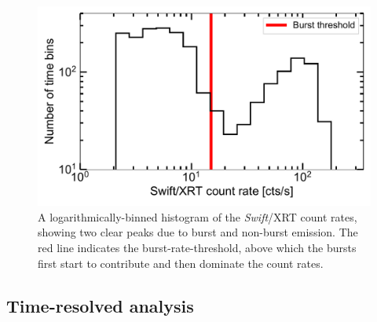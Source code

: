 \documentclass[fleqn,usenatbib]{mnras}
\begin{document}
\begin{figure}
\includegraphics[width=\columnwidth]{rate_histogram.pdf}
\caption{A logarithmically-binned histogram of the \textit{Swift}/XRT count rates, showing two clear peaks due to burst and non-burst emission. The red line indicates the burst-rate-threshold, above which the bursts first start to contribute and then dominate the count rates.}
 \label{fig:rate_hist}
\end{figure}

\subsection{Time-resolved analysis}
\label{sec:results_resolved}
\end{document}
